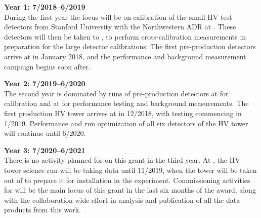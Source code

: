 \noindent\textbf{Year 1: 7/2018--6/2019}\\
During the first year the focus will be on calibration of the small HV test detectors from Stanford University with the Northwestern ADR at \tunl. These detectors will then be taken to \nexus, to perform cross-calibration measurements in preparation for the large detector calibrations. The first pre-production detectors arrive at \cute in January 2018, and the performance  and background measurement campaign begins soon after. 

\noindent\textbf{Year 2: 7/2019--6/2020}\\
The second year is dominated by runs of pre-production detectors at \nexus for calibration and at \cute for performance testing and background measurements. The first production \scs HV tower arrives at \cute in 12/2018, with testing commencing in 1/2019. Performance and run optimization of all six detectors of the HV tower will continue until 6/2020.

 \noindent\textbf{Year 3: 7/2020--6/2021}\\
There is no activity planned for \nexus on this grant in the third year. At \cute, the \scs HV tower science run will be taking data until 11/2019, when the tower will be taken out of \cute to prepare it for installation in the \scs experiment. Commissioning activities for \scs will be the main focus of this grant in the last six months of the award, along with the collaboration-wide effort in analysis and publication of all the data products from this work.
